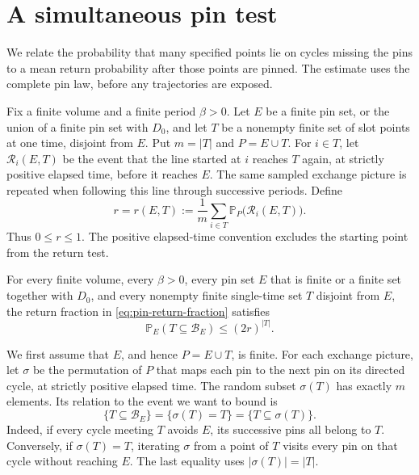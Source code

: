 \section{A simultaneous pin test}\label{sec:pin-test}

We relate the probability that many specified points lie on cycles missing
the pins to a mean return probability after those points are pinned.
The estimate uses the complete pin law, before any trajectories are exposed.

Fix a finite volume and a finite period $\beta>0$.  Let $E$ be a finite
pin set, or the union of a finite pin set with $D_0$, and let $T$ be a
nonempty finite set of slot points at one time, disjoint from $E$.
Put $m=|T|$ and $P=E\cup T$.
For $i\in T$, let $\mathcal R_i(E,T)$ be the event that the line started
at $i$ reaches $T$ again, at strictly positive elapsed time, before it
reaches $E$.  The same sampled exchange picture is repeated when following
this line through successive periods.  Define
\begin{equation}\label{eq:pin-return-fraction}
 r=r(E,T):=\frac1m\sum_{i\in T}
                  \mathbb P_P\bigl(\mathcal R_i(E,T)\bigr).
\end{equation}
Thus $0\le r\le1$.  The positive elapsed-time convention excludes the
starting point from the return test.

\begin{proposition}\label{prop:pin-test}
For every finite volume, every $\beta>0$, every pin set $E$ that is
finite or a finite set together with $D_0$, and every nonempty finite
single-time set $T$ disjoint from $E$, the return fraction in
\eqref{eq:pin-return-fraction} satisfies
\begin{equation}\label{eq:simultaneous-pin-test}
       \mathbb P_E(T\subseteq\mathcal B_E)\le (2r)^{|T|}.
\end{equation}
\end{proposition}

We first assume that $E$, and hence $P=E\cup T$, is finite.
For each exchange picture, let $\sigma$ be the permutation of $P$ that
maps each pin to the next pin on its directed cycle, at strictly positive
elapsed time.  The random subset $\sigma(T)$ has exactly $m$ elements.
Its relation to the event we want to bound is
\begin{equation}\label{eq:pin-event-equivalence}
       \{T\subseteq\mathcal B_E\}
             =\{\sigma(T)=T\}=\{T\subseteq\sigma(T)\}.
\end{equation}
Indeed, if every cycle meeting $T$ avoids $E$, its successive pins all
belong to $T$.  Conversely, if $\sigma(T)=T$, iterating $\sigma$ from
a point of $T$ visits every pin on that cycle without reaching $E$.
The last equality uses $|\sigma(T)|=|T|$.

